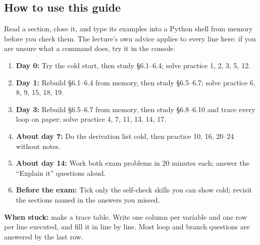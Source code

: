 \documentclass[11pt]{article}
\begin{document}
\begin{keepsection}
\section{How to use this guide}

Read a section, close it, and type its examples into a Python shell from memory before you check them. The lecture’s own advice applies to every line here: if you are unsure what a command does, try it in the console.

\begin{enumerate}
\item \textbf{Day 0:} Try the cold start, then study §6.1–6.4; solve practice 1, 2, 3, 5, 12.
\item \textbf{Day 1:} Rebuild §6.1–6.4 from memory, then study §6.5–6.7; solve practice 6, 8, 9, 15, 18, 19.
\item \textbf{Day 3:} Rebuild §6.5–6.7 from memory, then study §6.8–6.10 and trace every loop on paper; solve practice 4, 7, 11, 13, 14, 17.
\item \textbf{About day 7:} Do the derivation list cold, then practice 10, 16, 20–24 without notes.
\item \textbf{About day 14:} Work both exam problems in 20 minutes each; answer the “Explain it” questions aloud.
\item \textbf{Before the exam:} Tick only the self-check skills you can show cold; revisit the sections named in the answers you missed.
\end{enumerate}

\begin{notebox}\textbf{When stuck:} make a trace table. Write one column per variable and one row per line executed, and fill it in line by line. Most loop and branch questions are answered by the last row.\end{notebox}
\end{keepsection}
\end{document}
